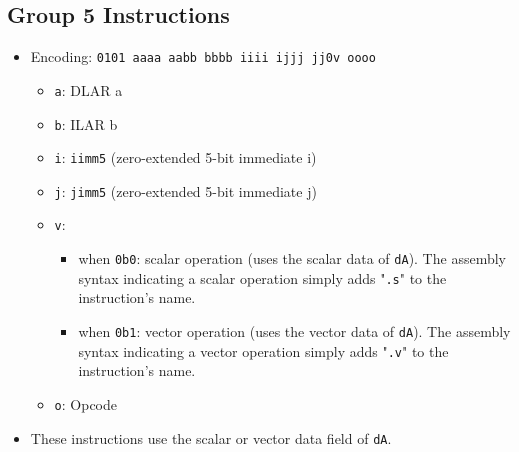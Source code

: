 \documentclass{article}
\begin{document}
	\subsection{Group 5 Instructions}
		\begin{itemize}
		\item Encoding:  \texttt{0101 aaaa aabb bbbb  iiii ijjj jj0v oooo}
			\begin{itemize}
			\item \texttt{a}:  DLAR a
			\item \texttt{b}:  ILAR b
			\item \texttt{i}:  \texttt{iimm5} (zero-extended 5-bit
			immediate i)
			\item \texttt{j}:  \texttt{jimm5} (zero-extended 5-bit
			immediate j)
			\item \texttt{v}:
				\begin{itemize}
				\item when \texttt{0b0}:  scalar operation (uses the scalar
				data of \texttt{dA}).  The assembly syntax indicating a
				scalar operation simply adds "\texttt{.s}" to the
				instruction's name.
				\item when \texttt{0b1}:  vector operation (uses the vector
				data of \texttt{dA}).  The assembly syntax indicating a
				vector operation simply adds "\texttt{.v}" to the
				instruction's name.
				\end{itemize}
			\item \texttt{o}:  Opcode
			\end{itemize}

		\item These instructions use the scalar or vector data field of
		\texttt{dA}.


\end{itemize}
\end{document}
